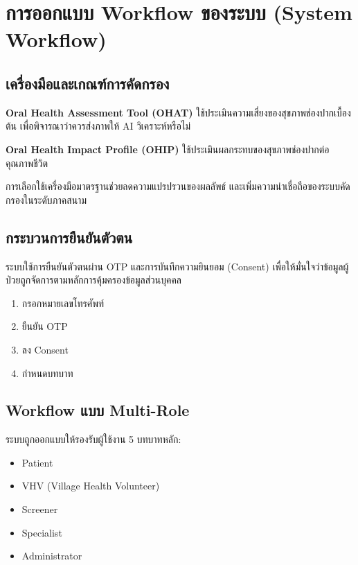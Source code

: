 \section{การออกแบบ Workflow ของระบบ (System Workflow)}

\subsection{เครื่องมือและเกณฑ์การคัดกรอง}

\begin{tcolorbox}[bluebox]
\textbf{Oral Health Assessment Tool (OHAT)}  
ใช้ประเมินความเสี่ยงของสุขภาพช่องปากเบื้องต้น
เพื่อพิจารณาว่าควรส่งภาพให้ AI วิเคราะห์หรือไม่

\textbf{Oral Health Impact Profile (OHIP)}  
ใช้ประเมินผลกระทบของสุขภาพช่องปากต่อคุณภาพชีวิต
\end{tcolorbox}

การเลือกใช้เครื่องมือมาตรฐานช่วยลดความแปรปรวนของผลลัพธ์
และเพิ่มความน่าเชื่อถือของระบบคัดกรองในระดับภาคสนาม

\subsection{กระบวนการยืนยันตัวตน}

ระบบใช้การยืนยันตัวตนผ่าน OTP และการบันทึกความยินยอม (Consent)
เพื่อให้มั่นใจว่าข้อมูลผู้ป่วยถูกจัดการตามหลักการคุ้มครองข้อมูลส่วนบุคคล

\begin{enumerate}
\item กรอกหมายเลขโทรศัพท์
\item ยืนยัน OTP
\item ลง Consent
\item กำหนดบทบาท
\end{enumerate}


\subsection{Workflow แบบ Multi-Role}

ระบบถูกออกแบบให้รองรับผู้ใช้งาน 5 บทบาทหลัก:

\begin{itemize}
\item Patient
\item VHV (Village Health Volunteer)
\item Screener
\item Specialist
\item Administrator
\end{itemize}

